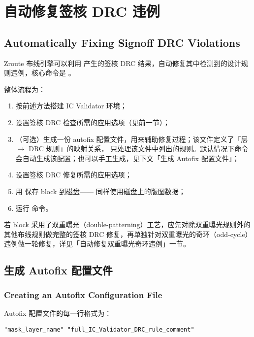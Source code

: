 \section{自动修复签核 DRC 违例}
\subsection*{Automatically Fixing Signoff DRC Violations}

Zroute 布线引擎可以利用  产生的签核 DRC 结果，自动修复其中检测到的设计规则违例，核心命令是 。

整体流程为：
\begin{enumerate}
  \item 按前述方法搭建 IC Validator 环境；
  \item 设置签核 DRC 检查所需的应用选项（见前一节）；
  \item （可选）生成一份 autofix 配置文件，用来辅助修复过程；该文件定义了「层 $\to$ DRC 规则」的映射关系， 只处理该文件中列出的规则。默认情况下命令会自动生成该配置；也可以手工生成，见下文「生成 Autofix 配置文件」；
  \item 设置签核 DRC 修复所需的应用选项；
  \item 用  保存 block 到磁盘—— 同样使用磁盘上的版图数据；
  \item 运行  命令。
\end{enumerate}

\begin{noteBox}
若 block 采用了双重曝光（double-patterning）工艺，应先对除双重曝光规则外的其他布线规则做完整的签核 DRC 修复，再单独针对双重曝光的奇环（odd-cycle）违例做一轮修复，详见「自动修复双重曝光奇环违例」一节。
\end{noteBox}

\subsection{生成 Autofix 配置文件}
\subsubsection*{Creating an Autofix Configuration File}

Autofix 配置文件的每一行格式为：

\begin{lstlisting}
"mask_layer_name" "full_IC_Validator_DRC_rule_comment"
\end{lstlisting}

